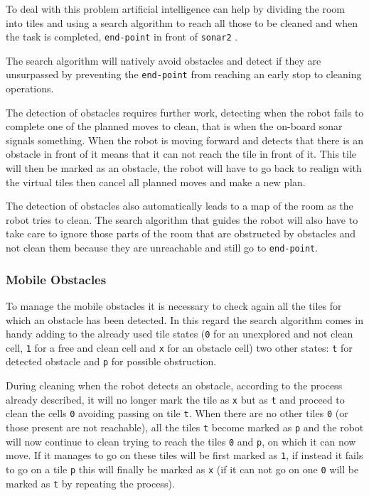To deal with this problem artificial intelligence can help by dividing the room into tiles and using a search algorithm to reach all those to be cleaned and when the task is completed, \texttt{end-point} in front of \texttt{sonar2} .

The search algorithm will natively avoid obstacles and detect if they are unsurpassed by preventing the \texttt{end-point} from reaching an early stop to cleaning operations.

The detection of obstacles requires further work, detecting when the robot fails to complete one of the planned moves to clean, that is when the on-board sonar signals something. When the robot is moving forward and detects that there is an obstacle in front of it means that it can not reach the tile in front of it. This tile will then be marked as an obstacle, the robot will have to go back to realign with the virtual tiles then cancel all planned moves and make a new plan.

The detection of obstacles also automatically leads to a map of the room as the robot tries to clean. The search algorithm that guides the robot will also have to take care to ignore those parts of the room that are obstructed by obstacles and not clean them because they are unreachable and still go to \texttt{end-point}.

\subsubsection{Mobile Obstacles}
To manage the mobile obstacles it is necessary to check again all the tiles for which an obstacle has been detected. In this regard the search algorithm comes in handy adding to the already used tile states (\texttt{0} for an unexplored and not clean cell, \texttt{1} for a free and clean cell and \texttt{x} for an obstacle cell) two other states: \texttt{t} for detected obstacle and \texttt{p} for possible obstruction.

During cleaning when the robot detects an obstacle, according to the process already described, it will no longer mark the tile as \texttt{x} but as \texttt{t} and proceed to clean the cells \texttt{0} avoiding passing on tile \texttt{t}. When there are no other tiles \texttt{0} (or those present are not reachable), all the tiles \texttt{t} become marked as \texttt{p} and the robot will now continue to clean trying to reach the tiles \texttt{0} and \texttt{p}, on which it can now move. If it manages to go on these tiles will be first marked as \texttt{1}, if instead it fails to go on a tile \texttt{p} this will finally be marked as \texttt{x} (if it can not go on one \texttt{0} will be marked as \texttt{t} by repeating the process).

